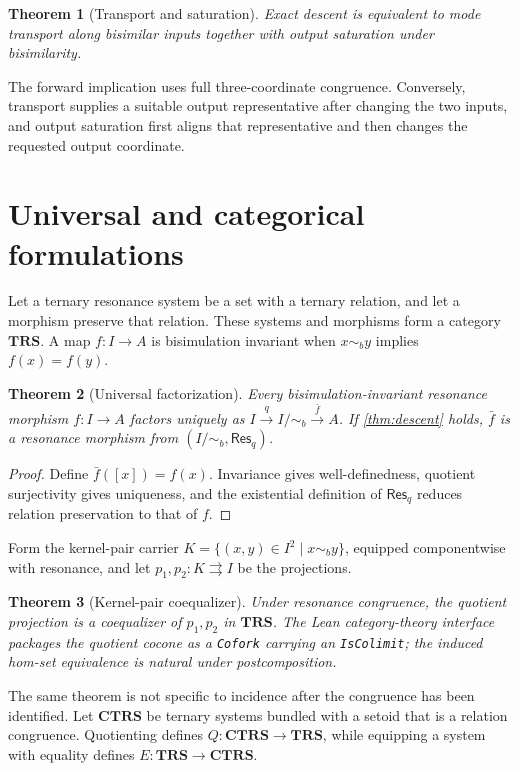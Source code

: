\documentclass[11pt]{article}
\newtheorem{theorem}{Theorem}[section]
\theoremstyle{definition}
\newcommand{\Res}{\mathsf{Res}}
\newcommand{\Bis}{\mathrel{\sim_{\!b}}}
\newcommand{\Quot}{I/{\sim_{\!b}}}
\begin{document}
\begin{theorem}[Transport and saturation]\label{thm:transport-saturation}
Exact descent is equivalent to mode transport along bisimilar inputs together
with output saturation under bisimilarity.
\end{theorem}
The forward implication uses full three-coordinate congruence.  Conversely,
transport supplies a suitable output representative after changing the two
inputs, and output saturation first aligns that representative and then changes
the requested output coordinate.

\section{Universal and categorical formulations}

Let a ternary resonance system be a set with a ternary relation, and let a
morphism preserve that relation.  These systems and morphisms form a category
$\mathbf{TRS}$.  A map $f:I\to A$ is bisimulation invariant when
$x\Bis y$ implies $f(x)=f(y)$.

\begin{theorem}[Universal factorization]\label{thm:factor}
Every bisimulation-invariant resonance morphism $f:I\to A$ factors uniquely as
$I\xrightarrow{q}\Quot\xrightarrow{\bar f}A$.  If
\cref{thm:descent} holds, $\bar f$ is a resonance morphism from
$(\Quot,\Res_q)$.
\end{theorem}
\begin{proof}
Define $\bar f([x])=f(x)$.  Invariance gives well-definedness, quotient
surjectivity gives uniqueness, and the existential definition of $\Res_q$
reduces relation preservation to that of $f$.
\end{proof}

Form the kernel-pair carrier
$K=\{(x,y)\in I^2\mid x\Bis y\}$, equipped componentwise with resonance, and
let $p_1,p_2:K\rightrightarrows I$ be the projections.

\begin{theorem}[Kernel-pair coequalizer]\label{thm:coeq}
Under resonance congruence, the quotient projection is a coequalizer of
$p_1,p_2$ in $\mathbf{TRS}$.  The Lean category-theory interface packages the
quotient cocone as a \texttt{Cofork} carrying an \texttt{IsColimit}; the induced
hom-set equivalence is natural under postcomposition.
\end{theorem}

The same theorem is not specific to incidence after the congruence has been
identified.  Let $\mathbf{CTRS}$ be ternary systems bundled with a setoid that
is a relation congruence.  Quotienting defines
$Q:\mathbf{CTRS}\to\mathbf{TRS}$, while equipping a system with equality defines
$E:\mathbf{TRS}\to\mathbf{CTRS}$.
\end{document}
